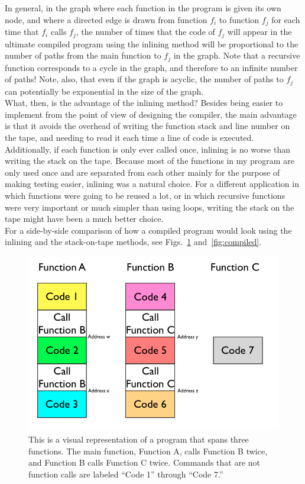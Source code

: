 \documentclass[11pt]{report}
\begin{document}
In general, in the graph where each function in the program is given its own node, and where a directed edge is drawn from function $f_i$ to function $f_j$ for each time that $f_i$ calls $f_j$, the number of times that the code of $f_j$ will appear in the ultimate compiled program using the inlining method will be proportional to the number of paths from the main function to $f_j$ in the graph. Note that a recursive function corresponds to a cycle in the graph, and therefore to an infinite number of paths! Note, also, that even if the graph is acyclic, the number of paths to $f_j$ can potentially be exponential in the size of the graph. \\

What, then, is the advantage of the inlining method? Besides being easier to implement from the point of view of designing the compiler, the main advantage is that it avoids the overhead of writing the function stack and line number on the tape, and needing to read it each time a line of code is executed. Additionally, if each function is only ever called once, inlining is no worse than writing the stack on the tape. Because most of the functions in my program are only used once and are separated from each other mainly for the purpose of making testing easier, inlining was a natural choice. For a different application in which functions were going to be reused a lot, or in which recursive functions were very important or much simpler than using loops, writing the stack on the tape might have been a much better choice. \\

For a side-by-side comparison of how a compiled program would look using the inlining and the stack-on-tape methods, see Figs.~\ref{fig:code} and~\ref{fig:compiled}.

\begin{figure} 
\begin{center} 
\includegraphics[scale=0.6]{figs/code.png} 
\caption{This is a visual representation of a program that spans three functions. The main function, Function A, calls Function B twice, and Function B calls Function C twice. Commands that are not function calls are labeled ``Code 1'' through ``Code 7.'' \label{fig:code}} 
\end{center} 
\end{figure}
\end{document}
